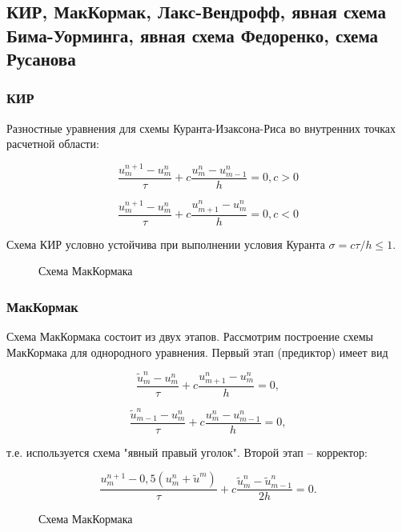 \documentclass{article}
\begin{document}
\subsection{КИР, МакКормак, Лакс-Вендрофф, явная схема Бима-Уорминга, явная схема Федоренко,  схема Русанова}

\subsubsection{КИР}

\indent
Разностные уравнения для схемы Куранта-Изаксона-Риса во внутренних точках расчетной области:

$$\frac{u^{n+1}_m - u^n_m}{\tau} + c\frac{u^n_m - u^n_{m-1}}{h} = 0, c > 0$$

$$\frac{u^{n+1}_m - u^n_m}{\tau} + c\frac{u^n_{m+1} - u^n_m}{h} = 0, c < 0$$

\indent
Схема КИР условно устойчива при выполнении условия Куранта $\sigma = c\tau/h \leq 1$.

\begin{figure}[h]
\caption{Схема МакКормака}
\label{ris:image}
\end{figure}  

\subsubsection{МакКормак}

\indent
Схема МакКормака состоит из двух этапов. Рассмотрим построение схемы МакКормака для однородного уравнения. Первый этап (предиктор) имеет вид

$$\frac{\tilde{u}^{n}_m - u^n_m}{\tau} + c\frac{u^n_{m+1} - u^n_m}{h} = 0,$$

$$\frac{\tilde{u}^{n}_{m-1} - u^n_m}{\tau} + c\frac{u^n_m - u^n_{m-1}}{h} = 0,$$

т.е. используется схема "явный правый уголок". Второй этап -- корректор:

$$\frac{u^{n+1}_m -0,5(u^n_m + \tilde{u}^m)}{\tau} + c\frac{\tilde{u}^n_{m} - \tilde{u}^n_{m-1}}{2h} = 0.$$

\begin{figure}[h]
\caption{Схема МакКормака}
\label{ris:image}
\end{figure}  
\end{document}
